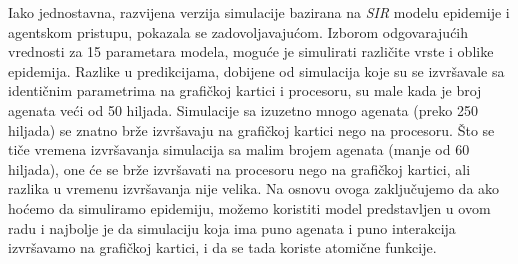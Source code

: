 Iako jednostavna, razvijena verzija simulacije bazirana na \emph{SIR} modelu epidemije i agentskom pristupu, pokazala se zadovoljavajućom. Izborom odgovarajućih vrednosti za 15 parametara modela, moguće je simulirati različite vrste i oblike epidemija. Razlike u predikcijama, dobijene od simulacija koje su se izvršavale sa identičnim parametrima na grafičkoj kartici i procesoru, su male kada je broj agenata veći od 50 hiljada. Simulacije sa izuzetno mnogo agenata (preko 250 hiljada) se znatno brže izvršavaju na grafičkoj kartici nego na procesoru. Što se tiče vremena izvršavanja simulacija sa malim brojem agenata (manje od 60 hiljada), one će se brže izvršavati na procesoru nego na grafičkoj kartici, ali razlika u vremenu izvršavanja nije velika. Na osnovu ovoga zaključujemo da ako hoćemo da simuliramo epidemiju, možemo koristiti model predstavljen u ovom radu i najbolje je da simulaciju koja ima puno agenata i puno interakcija izvršavamo na grafičkoj kartici, i da se tada koriste atomične funkcije.

\printbibliography[heading=subbibliography,title={Literatura}]

\newpage
\EndPaper
\clearpage

